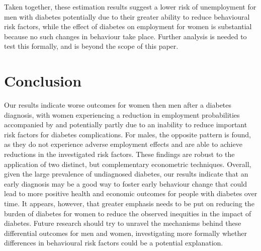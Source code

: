 Taken together, these estimation results suggest a lower risk of unemployment for men with diabetes potentially due to their greater ability to reduce behavioural risk factors, while the effect of diabetes on employment for women is substantial because no such changes in behaviour take place. Further analysis is needed to test this formally, and is beyond the scope of this paper.





\section{Conclusion}

Our results indicate worse outcomes for women then men after a diabetes diagnosis, with women experiencing a reduction in employment probabilities accompanied by and potentially partly due to an inability to reduce important risk factors for diabetes complications. For males, the opposite pattern is found, as they do not experience adverse employment effects and are able to achieve reductions in the investigated risk factors. These findings are robust to the application of two distinct, but complementary econometric techniques. Overall, given the large prevalence of undiagnosed diabetes, our results indicate that an early diagnosis may be a good way to foster early behaviour change that could lead to more positive health and economic outcomes for people with diabetes over time. It appears, however, that greater emphasis needs to be put on reducing the burden of diabetes for women to reduce the observed inequities in the impact of diabetes. Future research should try to unravel the mechanisms behind these differential outcomes for men and women, investigating more formally whether differences in behavioural risk factors could be a potential explanation.

\clearpage
